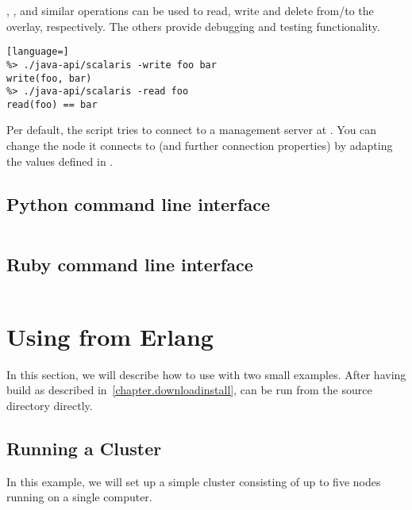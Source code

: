 , ,  and similar operations can be used to read, write
and delete from/to the overlay, respectively. The others
provide debugging and testing functionality.

\begin{lstlisting}[language=]
%> ./java-api/scalaris -write foo bar
write(foo, bar)
%> ./java-api/scalaris -read foo
read(foo) == bar
\end{lstlisting}

Per default, the  script tries to connect to a management
server at . You can change the node it connects to (and
further connection properties) by adapting the values defined in
.

\subsection{Python command line interface}

\begin{lstlisting}[language=sh]
%> ./python-api/scalaris --help
\end{lstlisting}


\subsection{Ruby command line interface}

\begin{lstlisting}[language=sh]
%> ./ruby-api/scalaris --help
\end{lstlisting}


\section{Using \scalaris{} from Erlang}
\label{chapter.systemuse.usingfromerl}

In this section, we will describe how to use \scalaris{} with two small
examples. After having build \scalaris{} as described
in~\ref{chapter.downloadinstall}, \scalaris{} can be run from the source
directory directly.

\subsection{Running a \scalaris{} Cluster}
In this example, we will set up a simple \scalaris{} cluster consisting of
up to five nodes running on a single computer.

